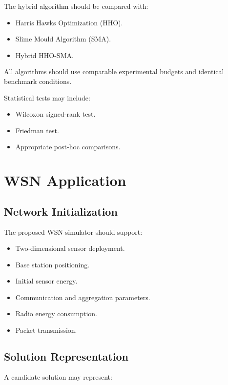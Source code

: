 \documentclass[12pt,a4paper]{report}
\begin{document}
The hybrid algorithm should be compared with:

\begin{itemize}
    \item Harris Hawks Optimization (HHO).
    \item Slime Mould Algorithm (SMA).
    \item Hybrid HHO-SMA.
\end{itemize}

All algorithms should use comparable experimental
budgets and identical benchmark conditions.

Statistical tests may include:

\begin{itemize}
    \item Wilcoxon signed-rank test.
    \item Friedman test.
    \item Appropriate post-hoc comparisons.
\end{itemize}

\chapter{WSN Application}

\section{Network Initialization}

The proposed WSN simulator should support:

\begin{itemize}
    \item Two-dimensional sensor deployment.
    \item Base station positioning.
    \item Initial sensor energy.
    \item Communication and aggregation parameters.
    \item Radio energy consumption.
    \item Packet transmission.
\end{itemize}

\section{Solution Representation}

A candidate solution may represent:
\end{document}
